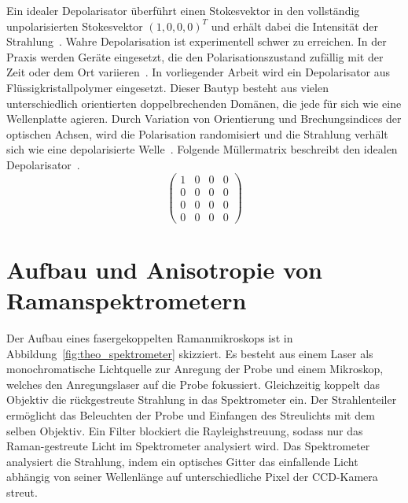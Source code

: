 \documentclass[a4paper,12pt,twoside,parskip=no,headsepline,open=right,ngerman,export]{scrreprt}
\begin{document}
            Ein idealer Depolarisator überführt einen Stokesvektor in den vollständig unpolarisierten Stokesvektor $(1, 0, 0, 0)^T$ und erhält dabei die Intensität der Strahlung~\cite{gil_polarized_2016}. Wahre Depolarisation ist experimentell schwer zu erreichen. In der Praxis werden Geräte eingesetzt, die den Polarisationszustand zufällig mit der Zeit oder dem Ort variieren~\cite{wei_liquid_2016}. In vorliegender Arbeit wird ein Depolarisator aus Flüssigkristallpolymer eingesetzt. Dieser Bautyp besteht aus vielen unterschiedlich orientierten doppelbrechenden Domänen, die jede für sich wie eine Wellenplatte agieren. Durch Variation von Orientierung und Brechungsindices der optischen Achsen, wird die Polarisation randomisiert und die Strahlung verhält sich wie eine depolarisierte Welle~\cite{wei_liquid_2016}. Folgende Müllermatrix beschreibt den idealen Depolarisator~\cite{gil_polarized_2016}.
            \begin{equation*}
                \begin{pmatrix}
                    1 & 0 & 0 & 0 \\
                    0 & 0 & 0 & 0 \\
                    0 & 0 & 0 & 0 \\
                    0 & 0 & 0 & 0
                \end{pmatrix}
            \end{equation*}
        \section{Aufbau und Anisotropie von Ramanspektrometern}\label{sec:theo_ramanspektrometer}
        
            
            
            Der Aufbau eines fasergekoppelten Ramanmikroskops ist in Abbildung~\ref{fig:theo_spektrometer} skizziert. Es besteht aus einem Laser als monochromatische Lichtquelle zur Anregung der Probe und einem Mikroskop, welches den Anregungslaser auf die Probe fokussiert. Gleichzeitig koppelt das Objektiv die rückgestreute Strahlung in das Spektrometer ein. Der Strahlenteiler ermöglicht das Beleuchten der Probe und Einfangen des Streulichts mit dem selben Objektiv. Ein Filter blockiert die Rayleighstreuung, sodass nur das Raman-gestreute Licht im Spektrometer analysiert wird. Das Spektrometer analysiert die Strahlung, indem ein optisches Gitter das einfallende Licht abhängig von seiner Wellenlänge auf unterschiedliche Pixel der CCD-Kamera streut.~\cite{muller_entwicklung_2017, delhaye_3_1996}
            
\end{document}
